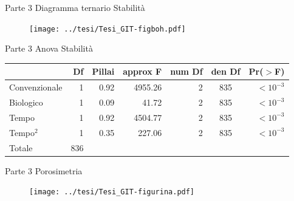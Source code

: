\documentclass[10pt]{beamer}
\begin{document}
\begin{frame}[label=distribuzione]{Parte 3 \small{Diagramma ternario Stabilità}}
  \hyperlink{finale}{}
  
  \begin{figure}
    \texttt{[image: ../tesi/Tesi\_GIT-figboh.pdf]}
  \end{figure}
\end{frame}



\begin{frame}[label=Anova]{Parte 3 \small{Anova Stabilità}}
  \hyperlink{Composizionale}{}
  \footnotesize
  \begin{table}
    \centering
    \begin{tabular}{lrrrrcr}
      \hline
                    & Df&Pillai& approx F & num Df & den Df & Pr($>$F) \\ 
      \hline
      Convenzionale & 1 & 0.92 & 4955.26  &      2 &    835 & $<10^{-3}$\\ 
      Biologico     & 1 & 0.09 & 41.72    &      2 &    835 & $<10^{-3}$\\ 
      Tempo         & 1 & 0.92 & 4504.77  &      2 &    835 & $<10^{-3}$\\ 
      Tempo$^2$     & 1 & 0.35 & 227.06   &      2 &    835 & $<10^{-3}$\\ 
      Totale        & 836 &    &          &        &        &          \\ 
      \hline
    \end{tabular}
  \end{table}
\end{frame}

\begin{frame}[label=Porosimetria]{Parte 3 \small{Porosimetria}}
  \hyperlink{finale}{}
  
  \begin{figure}
    \texttt{[image: ../tesi/Tesi\_GIT-figurina.pdf]}
  \end{figure}
\end{frame}
\end{document}
